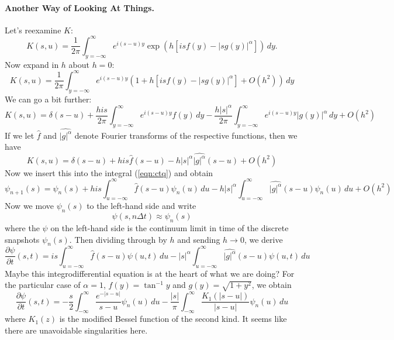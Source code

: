 \documentclass[11pt,letterpaper]{article}
\begin{document}
\paragraph{Another Way of Looking At Things.}
Let's reexamine $K$:
\[
K(s,u) = \frac{1}{2\pi}\int_{y=-\infty}^{\infty}e^{i (s-u) y} \exp{\left( h [ i s f(y) - |s g(y)|^\alpha ] \right)} \, dy.
\]
Now expand in $h$ about $h=0$:
\[
K(s,u) = \frac{1}{2 \pi} \int_{y=-\infty}^\infty e^{i (s-u) y} (1 + h [ i s f(y) - |s g(y) |^\alpha ]  + O(h^2) ) \, dy
\]
We can go a bit further:
\[
K(s,u) = \delta(s-u) + \frac{h i s}{2 \pi} \int_{y=-\infty}^\infty e^{i (s-u) y} f(y) \, dy - \frac{ h |s|^\alpha }{2 \pi} \int_{y=-\infty}^\infty e^{i (s-u) y} |g(y)|^\alpha \, dy + O(h^2)
\]
If we let $\widehat{f}$ and $\widehat{|g|^\alpha}$ denote Fourier transforms of the respective functions, then we have
\[
K(s,u) = \delta(s-u) + h i s \widehat{f}(s-u) - h |s|^\alpha \widehat{|g|^\alpha}(s-u) + O(h^2)
\]
Now we insert this into the integral (\ref{eqn:ctq}) and obtain
\[
\psi_{n+1}(s) = \psi_n(s) + h i s \int_{u=-\infty}^\infty \widehat{f}(s-u) \psi_n(u) \, du - h |s|^\alpha \int_{u=-\infty}^\infty \widehat{|g|^\alpha}(s-u) \psi_n(u) \, du + O(h^2)
\]
Now we move $\psi_n(s)$ to the left-hand side and write
\[
\psi(s, n \Delta t) \approx \psi_n(s)
\]
where the $\psi$ on the left-hand side is the continuum limit in time of the discrete snapshots $\psi_n(s)$.  Then dividing through by $h$ and sending $h \to 0$, we derive
\begin{equation}
\label{eqn:psicontevol}
\frac{\partial \psi}{\partial t} (s,t) = i s \int_{u=-\infty}^\infty  \widehat{f}(s-u) \psi(u,t) \, du - |s|^\alpha \int_{u=-\infty}^\infty \widehat{|g|^\alpha}(s-u) \psi(u,t) \, du
\end{equation}
Maybe this integrodifferential equation is at the heart of what we are doing?  For the particular case of $\alpha = 1$, $f(y) = \tan^{-1} y$ and $g(y) = \sqrt{1+y^2}$, we obtain
\[
\frac{\partial \psi}{\partial t} (s,t) = - \frac{s}{2} \int_{-\infty}^\infty \frac{e^{-|s-u|}}{s-u} \psi_n(u) \, du - \frac{|s|}{\pi} \int_{-\infty}^\infty \frac{K_1(|s-u|)}{|s-u|} \psi_n(u) \, du
\]
where $K_1(z)$ is the modified Bessel function of the second kind.  It seems like there are unavoidable singularities here.
\end{document}
